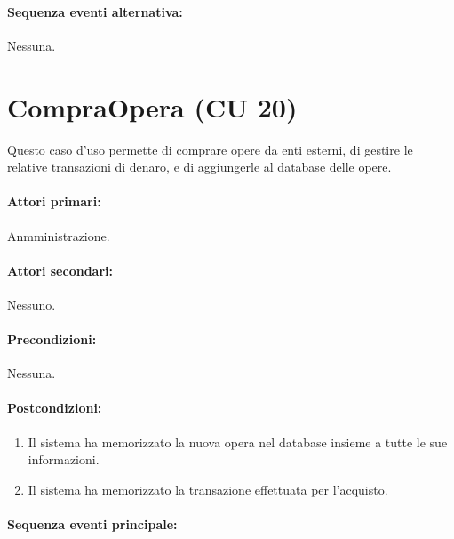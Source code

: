 \documentclass{article}
\begin{document}
	\paragraph{Sequenza eventi alternativa:}Nessuna. 






	

	
	
	
	
	\pagebreak 
	
	\section*{CompraOpera (CU 20)}
	
	\indent\indent Questo caso d'uso permette di comprare opere da enti esterni, di gestire le relative transazioni di denaro, e di aggiungerle al database delle opere.
	
	\paragraph{Attori primari:}Anmministrazione.
	
	\paragraph{Attori secondari:}Nessuno.
	
	\paragraph{Precondizioni:}Nessuna.
	
	\paragraph{Postcondizioni:}
		\begin{enumerate}[itemsep=8pt,parsep=0pt]
			\item Il sistema ha memorizzato la nuova opera nel database insieme a tutte le sue informazioni.
			\item Il sistema ha memorizzato la transazione effettuata per l'acquisto.
		\end{enumerate}
	
	\paragraph{Sequenza eventi principale:}
\end{document}
